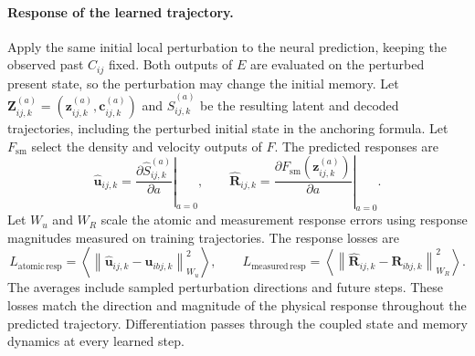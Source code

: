 \documentclass[11pt,a4paper]{article}
\newcommand{\norm}[1]{\left\lVert #1\right\rVert}
\newcommand{\avg}[1]{\left\langle #1\right\rangle}
\newcommand{\z}{\mathbf z}
\newcommand{\Z}{\mathbf Z}
\newcommand{\cstate}{\mathbf c}
\begin{document}
\paragraph{Response of the learned trajectory.}
Apply the same initial local perturbation to the neural prediction, keeping
the observed past $C_{ij}$ fixed. Both outputs of $E$ are evaluated on the
perturbed present state, so the perturbation may change the initial memory.
Let $\Z_{ij,k}^{(a)}=(\z_{ij,k}^{(a)},\cstate_{ij,k}^{(a)})$ and
$\widehat S_{ij,k}^{(a)}$ be the resulting latent and decoded trajectories,
including the perturbed initial state in the anchoring formula.
Let $F_{\mathrm{sm}}$ select the density and velocity outputs of $F$. The
predicted responses are
\[
\widehat{\mathbf u}_{ij,k}
=\left.\frac{\partial\widehat S_{ij,k}^{(a)}}{\partial a}\right|_{a=0},
\qquad
\widehat{\mathbf R}_{ij,k}
=\left.\frac{\partial F_{\mathrm{sm}}(\z_{ij,k}^{(a)})}{\partial a}\right|_{a=0}.
\]
Let $W_u$ and $W_R$ scale the atomic and measurement response errors using
response magnitudes measured on training trajectories. The response losses are
\[
L_{\mathrm{atomic\,resp}}
=\avg{\norm{\widehat{\mathbf u}_{ij,k}-\mathbf u_{ibj,k}}_{W_u}^2},
\qquad
L_{\mathrm{measured\,resp}}
=\avg{\norm{\widehat{\mathbf R}_{ij,k}-\mathbf R_{ibj,k}}_{W_R}^2}.
\]
The averages include sampled perturbation directions and future steps. These
losses match the direction and magnitude of the physical response throughout
the predicted trajectory. Differentiation passes through the coupled state
and memory dynamics at every learned step.
\end{document}
